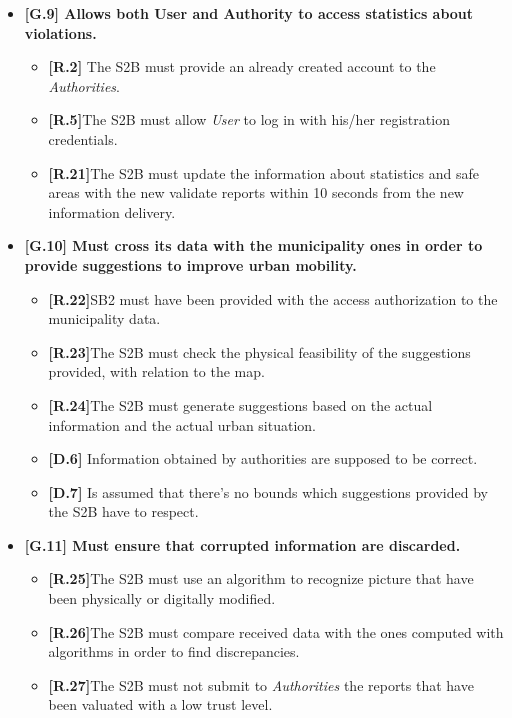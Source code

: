 \begin{itemize}
\item \textbf{{[G.9]} Allows both User and Authority to access statistics about violations.}
     \begin{itemize}
         \item \textbf{[R.2]} The S2B must provide an already created account to the \textit{Authorities}.

        \item \textbf{[R.5]}The S2B must allow \textit{User} to log in with his/her registration credentials.
        
        \item \textbf{[R.21]}The S2B must update the information about statistics and safe areas with the new validate reports within 10 seconds from the new information delivery.
        
    \end{itemize}
    
    
\item \textbf{{[G.10]} Must cross its data with the municipality ones in order to provide suggestions to improve urban mobility.}
    \begin{itemize}
        
         \item \textbf{[R.22]}SB2 must have been provided with the access authorization to the municipality data.
         
         \item \textbf{[R.23]}The S2B must check the physical feasibility of the suggestions provided, with relation to the map.
         
         \item \textbf{[R.24]}The S2B must generate suggestions based on the actual information and the actual urban situation.
       
         \item \textbf{[D.6]} Information obtained by authorities are    supposed to be correct.
         
         \item \textbf{[D.7]} Is assumed that there's no bounds which suggestions provided by the S2B have to respect.
          
    \end{itemize}
    
\item \textbf{{[G.11]} Must ensure that corrupted information are discarded.}
    \begin{itemize}
        \item \textbf{[R.25]}The S2B must use an algorithm to recognize picture that have been physically or digitally modified.
        
        \item \textbf{[R.26]}The S2B must compare received data with the ones computed with algorithms in order to find discrepancies.
        
        \item \textbf{[R.27]}The S2B must not submit to \textit{Authorities} the reports that have been valuated with a low trust level.
    \end{itemize}
\end{itemize}


